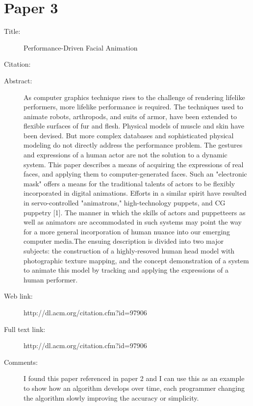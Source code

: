 \documentclass{scrartcl}
\begin{document}
\section*{Paper 3}
\begin{description}
\item[Title:] Performance-Driven Facial Animation 
\item[Citation:] \cite{williams1990performance}
\item[Abstract:] As computer graphics technique rises to the challenge of rendering lifelike performers, more lifelike performance is required. The techniques used to animate robots, arthropods, and suits of armor, have been extended to flexible surfaces of fur and flesh. Physical models of muscle and skin have been devised. But more complex databases and sophisticated physical modeling do not directly address the performance problem. The gestures and expressions of a human actor are not the solution to a dynamic system. This paper describes a means of acquiring the expressions of real faces, and applying them to computer-generated faces. Such an "electronic mask" offers a means for the traditional talents of actors to be flexibly incorporated in digital animations. Efforts in a similar spirit have resulted in servo-controlled "animatrons," high-technology puppets, and CG puppetry [1]. The manner in which the skills of actors and puppetteers as well as animators are accommodated in such systems may point the way for a more general incorporation of human nuance into our emerging computer media.The ensuing description is divided into two major subjects: the construction of a highly-resoved human head model with photographic texture mapping, and the concept demonstration of a system to animate this model by tracking and applying the expressions of a human performer.
\item[Web link:] http://dl.acm.org/citation.cfm?id=97906
\item[Full text link:] http://dl.acm.org/citation.cfm?id=97906
\item[Comments:] I found this paper referenced in paper 2 and I can use this as an example to show how an algorithm develops over time, each programmer changing the algorithm slowly improving the accuracy or simplicity.
\end{description}
\end{document}
